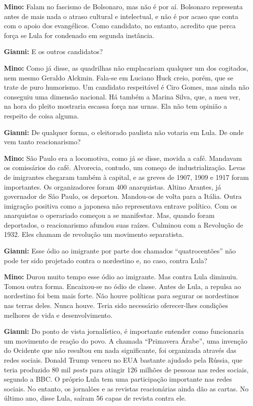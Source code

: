 \textbf{Mino:} Falam no fascismo de Bolsonaro, mas não é por aí.
Bolsonaro representa antes de mais nada o atraso cultural e intelectual,
e não é por acaso que conta com o apoio dos evangélicos. Como candidato,
no entanto, acredito que perca força se Lula for condenado em segunda
instância.

\textbf{Gianni:} E os outros candidatos?

\textbf{Mino:} Como já disse, as quadrilhas não emplacariam qualquer um
dos cogitados, nem mesmo Geraldo Alckmin. Fala-se em Luciano Huck creio,
porém, que se trate de puro humorismo. Um candidato respeitável é Ciro
Gomes, mas ainda não conseguiu uma dimensão nacional. Há também a Marina
Silva, que, a meu ver, na hora do pleito mostraria escassa força nas
urnas. Ela não tem opinião a respeito de coisa alguma.

\textbf{Gianni:} De qualquer forma, o eleitorado paulista não votaria em
Lula. De onde vem tanto reacionarismo?

\textbf{Mino:} São Paulo era a locomotiva, como já se disse, movida a
café. Mandavam os comissários do café. Alvorecia, contudo, um começo de
industrialização. Levas de imigrantes chegaram também à capital, e as
greves de 1907, 1909 e 1917 foram importantes. Os organizadores foram
400 anarquistas. Altino Arantes, já governador de São Paulo, os
deportou. Mandou-os de volta para a Itália. Outra imigração positiva
como a japonesa não representava entrave político. Com os anarquistas o
operariado começou a se manifestar. Mas, quando foram deportados, o
reacionarismo afundou suas raízes. Culminou com a Revolução de 1932.
Eles chamam de revolução um movimento separatista.

\textbf{Gianni:} Esse ódio ao imigrante por parte dos chamados
``quatrocentões'' não pode ter sido projetado contra o nordestino e, no
caso, contra Lula?

\textbf{Mino:} Durou muito tempo esse ódio ao imigrante. Mas contra Lula
diminuiu. Tomou outra forma. Encaixou-se no ódio de classe. Antes de
Lula, a repulsa ao nordestino foi bem mais forte. Não houve políticas
para segurar os nordestinos nas terras deles. Nunca houve. Teria sido
necessário oferecer-lhes condições melhores de vida e desenvolvimento.

\textbf{Gianni:} Do ponto de vista jornalístico, é importante entender
como funcionaria um movimento de reação do povo. A chamada ``Primavera
Árabe'', uma invenção do Ocidente que não resultou em nada significante,
foi organizada através das redes sociais. Donald Trump venceu no EUA
bastante ajudado pela Rússia, que teria produzido 80 mil \emph{posts}
para atingir 126 milhões de pessoas nas redes sociais, segundo a BBC. O
próprio Lula tem uma participação importante nas redes sociais. No
entanto, os jornalões e as revistas reacionárias ainda dão as cartas. No
último ano, disse Lula, saíram 56 capas de revista contra ele.

